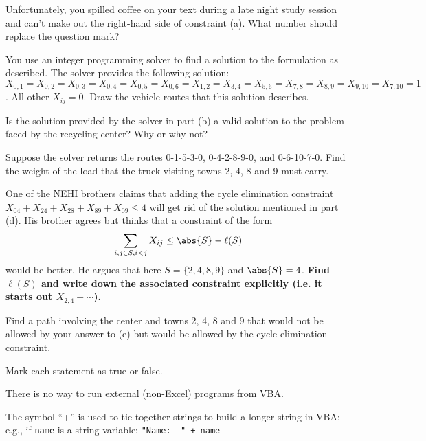 \vspace{0.5cm}

\begin{parts}
   Unfortunately, you spilled coffee on your text during a late night study session and can't make out the right-hand side of constraint (a). What number should replace the question mark? 

\newpage

   You use an integer programming solver to find a solution to the formulation as described. The solver provides the following solution: $X_{0,1}=X_{0,2}=X_{0,3}=X_{0,4}=X_{0,5}=X_{0,6}=X_{1,2}=X_{3,4}=X_{5,6}=X_{7,8}=X_{8,9}=X_{9,10}=X_{7,10}=1$.  All other $X_{ij} = 0$.  Draw the vehicle routes that this solution describes.

\vspace{3in}

 

   Is the solution provided by the solver in part (b) a valid solution to the problem faced by the recycling center? Why or why not?

  \vspace{2in}
  
   Suppose the solver returns the routes 0-1-5-3-0, 0-4-2-8-9-0, and 0-6-10-7-0. Find the weight of the load that the truck visiting towns 2, 4, 8 and 9 must carry. 
  

  
  
  \newpage
   One of the NEHI brothers claims that adding the cycle elimination constraint $X_{04} + X_{24} + X_{28} + X_{89} + X_{09} \leq 4$ will get rid of the solution mentioned in part (d). His brother agrees but thinks that a constraint of the form   
\[
\sum_{i,j \in S, i<j} X_{ij} \le \abs{S} - \ell (S)
\]
would be better. He argues that here $S = \{2,4,8,9\}$ and $\abs{S} = 4$. {\bf Find $\ell(S)$ and write down the associated constraint explicitly (i.e. it starts out $X_{2,4}+\cdots$).}\vspace{1.5in}

 Find a path involving the center and towns 2, 4, 8 and 9 that would not be allowed by your answer to (e) but would be allowed by the cycle elimination constraint. 
\vspace{2in}

\end{parts}
 Mark each statement as true or false. \\

\smallskip
\begin{parts}
\pt \underline{\hspace{1cm}} There is no way to run external (non-Excel) programs from VBA. \vspace{0.33in}

\pt \underline{\hspace{1cm}} The symbol ``+'' is used to tie together strings to build a longer string in VBA; e.g., if \texttt{name} is a string variable:  \verb!"Name:  " + name!


\end{parts}

